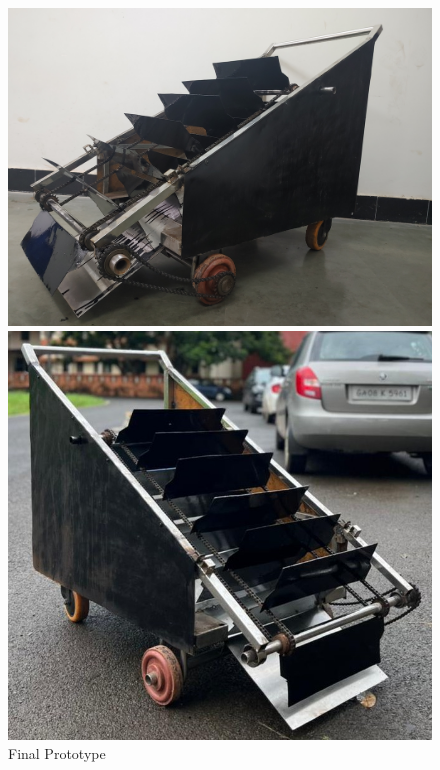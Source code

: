 \begin{figure}[H]
  \centering
    \begin{minipage}{0.9\textwidth}
    \centering
      \includegraphics[width=1\textwidth]{Final Prototype.jpg}
    \end{minipage}
\hfill
    \begin{minipage}{0.9\textwidth}
    \centering
      \includegraphics[width=1\textwidth]{prototype 2.jpg}
    \end{minipage}
    
    \caption{Final Prototype}
    \label{fig:Final Prototype}
\end{figure}


